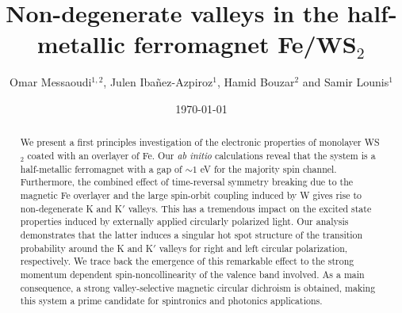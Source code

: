 \documentclass[aps,prb,showpacs,preprintnumbers,twocolumn,amsmath,amssymb]{revtex4-1}
\begin{document}
\title{Non-degenerate valleys in the half-metallic ferromagnet Fe/WS$_2$}


\date{\today}
\author{Omar Messaoudi$^{1,2}$, Julen Iba\~{n}ez-Azpiroz$^{1}$, Hamid Bouzar$^{2}$ and Samir Lounis$^{1}$}

\address{
$^{1}$Peter Gr\"{u}nberg Institut and Institute for Advanced Simulation, Forschungszentrum J\"{u}lich \& JARA, D-52425 J\"{u}lich, Germany
}
\address{$^{2}$ Laboratoire de Physique et Chimie Quantique (LPCQ), Universit\'e Mouloud Mammeri Tizi-Ouzou, BP 17 RP, 15000 Tizi-Ouzou, Alg\'erie}




\begin{abstract}

We present a first principles investigation of the electronic properties of monolayer WS$_2$ coated with an overlayer of Fe. Our \textit{ab initio} calculations reveal that the system is a half-metallic ferromagnet with a gap of $\sim 1$ eV for the majority spin channel. Furthermore, the combined effect of time-reversal symmetry breaking due to the magnetic Fe overlayer and the large spin-orbit coupling induced by W gives rise to non-degenerate K and K$'$ valleys. 
This has a tremendous impact on the excited state properties induced by externally applied circularly polarized light. 
Our analysis demonstrates that the latter induces a singular hot spot structure of the transition probability around the K and K$'$ valleys for right and left circular polarization, respectively. 
We trace back the emergence of this remarkable effect to the strong momentum dependent spin-noncollinearity of the valence band involved. As a main consequence, a strong valley-selective magnetic circular dichroism is obtained, making this system a prime candidate for spintronics
and photonics applications.


\end{abstract}

\maketitle
\end{document}
